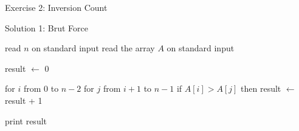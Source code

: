 \documentclass{beamer}
\begin{document}
\begin{frame}[fragile]{Exercise 2: Inversion Count}
  
  \begin{code}{Solution 1: Brut Force}
    \begin{PseudoCode}
read $n$ on standard input    
read the array $A$ on standard input    

result $\leftarrow$ 0

for $i$ from 0 to $n-2$
    for $j$ from $i+1$ to $n-1$
        if $A[i] > A[j]$ then
            result $\leftarrow$ result + 1

print result
    \end{PseudoCode}
  \end{code}
  
\end{frame}
\end{document}
